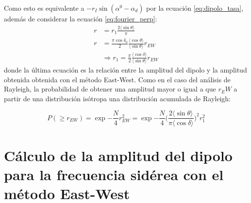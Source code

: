 
Como esto es equivalente a $-r_I\sin(\alpha^0  - \alpha_d)$ por la ecuación \ref{eq:dipolo_tasa}, además de considerar la ecuación \ref{eq:fourier_perp}:
\begin{align}
    r  &= r_1 \frac{2\langle\sin\theta \rangle }{\pi}\\
    r &= \frac{\pi \cos\delta_0}{2} \frac{\langle\cos\theta \rangle}{\langle\sin\theta \rangle} r_{EW} \\
    &\Rightarrow  r_1 = \frac{\pi}{2} \frac{\langle\cos\delta \rangle}{\langle\sin\theta \rangle} r_{EW}
\end{align}
donde la última ecuación es la relación entre la amplitud del dipolo y la amplitud obtenida obtenida con el método East-West. Como en el caso del análisis de Rayleigh, la probabilidad de obtener una amplitud mayor o igual a que $r_EW$ a partir de una distribución isótropa una distribución acumulada de Rayleigh:

\begin{equation}
    P(\geq r_{EW}) = \exp{-\frac{N}{4}r^2_{EW}} = \exp{-\frac{N}{4} \Big ( \frac{2 \langle\sin\theta \rangle }{\pi \langle\cos\delta \rangle} \Big)^2 r^2_{1} }
\end{equation}


\section{Cálculo de la amplitud del dipolo para la frecuencia sidérea con el método East-West}

